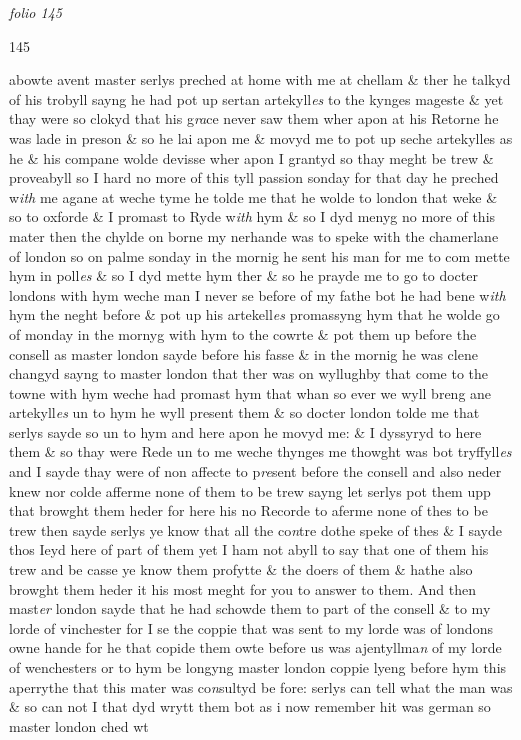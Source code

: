 \documentclass[12pt, a4paper]{book}
\begin{document}
\textit{folio 145}



\begin{flushright}{\color{Mahogany}145}\end{flushright}

		\ifthenelse{\isodd{\thepage}}
		{\reversemarginpar}
		{\normalmarginpar}
		abowte avent master serlys preched at home with me at chellam \& ther
 he talkyd of his trobyll sayng he had pot up sertan artekyll\textit{es} to the kynges
 mageste \& yet thay were so clokyd that his g\textit{ra}ce never saw them wher
 apon at his Retorne he was lade in preson \& so he lai apon me \& movyd
 me to pot up seche artekylles as he \& his compane wolde devisse
 wher apon I grantyd so thay meght be trew \& proveabyll so I hard
 no more of this tyll passion sonday for that day he preched w\textit{ith} me
	agane at weche tyme he tolde me that he wolde to london that
	weke \& so to oxforde \& I promast to Ryde w\textit{ith} hym \& so I dyd menyg
 no more of this mater then the chylde on borne my nerhande
 was to speke with the chamerlane of london so on palme sonday in
 the mornig he sent his man for me to com mette hym in poll\textit{es} \& so I
 dyd mette hym ther \& so he prayde me to go to docter londons with
 hym weche man I never se before of my fathe bot he had bene
 w\textit{ith} hym the neght before \& pot up his artekell\textit{es} promassyng hym
 that he wolde go of monday in the mornyg with hym to the cowrte
 \& pot them up before the consell as master london sayde before his
	fasse \& in the mornig he was clene changyd sayng to master
		london that ther was on wyllughby that come to the towne
 with hym weche had promast hym that whan so ever we wyll
 breng ane artekyll\textit{es} un to hym he wyll present them \& so
 docter london tolde me that serlys sayde so un to hym and
 here apon he movyd me: \& I dyssyryd to here them \& so thay
 were Rede un to me weche thynges me thowght was bot
 tryffyll\textit{es} and I sayde thay were of non affecte to p\textit{re}sent before
 the consell and also neder knew nor colde afferme none of
 them to be trew sayng let serlys pot them upp that browght
 them heder for here his no Recorde to aferme none of thes to
 be trew then sayde serlys ye know that all the co\textit{n}tre dothe
 speke of thes \& I sayde thos Ieyd here of part of them yet
 I ham not abyll to say that one of them his trew and
 be casse ye know them profytte \& the doers of them \& hathe
 also browght them heder it his most meght for you to answer
 to them. And then mast\textit{er} london sayde that he had schowde them
	to part of the consell \& to my lorde of vinchester for I se the
	coppie that was sent to my lorde was
			 of londons owne hande for
 he that copide them owte before us was ajentyllma\textit{n} of
	my lorde of wenchesters or to hym be longyng master london
 coppie lyeng before hym this aperrythe that this mater
 was co\textit{n}sultyd be fore: serlys can tell what the man was \& so
 can not I that dyd wrytt them  bot as i now remember hit was german
			 so master london ched wt
            		
\end{document}
